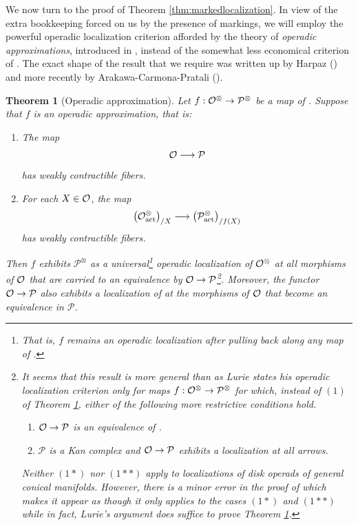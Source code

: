 \documentclass[10pt, reqno, twoside
, final
]{amsart}
\numberwithin{equation}{subsection}%
\theoremstyle{definition}
\theoremstyle{definition}
\theoremstyle{definition}
\theoremstyle{definition}
\theoremstyle{definition}
\theoremstyle{definition}
\theoremstyle{definition}
\theoremstyle{definition}
\theoremstyle{definition}
\theoremstyle{plain}
\newtheorem{thm}[defn]{Theorem}
\theoremstyle{definition}
\theoremstyle{plain}
\theoremstyle{definition}
\theoremstyle{plain}
\theoremstyle{definition}
\theoremstyle{definition}
\theoremstyle{plain}
\theoremstyle{plain}
\theoremstyle{definition}
\theoremstyle{plain}
\theoremstyle{plain}
\theoremstyle{plain}
\begin{document}
We now turn to the proof of Theorem \ref{thm:markedlocalization}. In view of the extra bookkeeping forced on us by the presence of markings, we will employ the powerful operadic localization criterion afforded by the theory of \emph{operadic approximations}, introduced in \cite[Section 2.3.3]{LurHA}, instead of the somewhat less economical criterion of \cite[Lemma A.4.7]{KSW}. The exact shape of the result that we require was written up by Harpaz (\cite{Harpaz-littledisks}) and more recently by Arakawa-Carmona-Pratali (\cite{ACP-DendroidalRezkNerve}).
\begin{thm}[Operadic approximation]\label{thm:operadic approximation}
Let $f:\mathcal{O}^{\otimes}\rightarrow \mathcal{P}^{\otimes}$ be a map of \infopst. Suppose that $f$ is an \emph{operadic approximation}, that is:
\begin{enumerate}[$(1)$]
    \item The map 
    \[  \mathcal{O}\longrightarrow \mathcal{P} \]
    has weakly contractible fibers.
    \item For each $X\in \mathcal{O}$, the map 
    \[ \left(\mathcal{O}^{\otimes}_{\mathrm{act}} \right)_{/X}\longrightarrow \left(\mathcal{P}^{\otimes}_{\mathrm{act}} \right)_{/f(X)} \]
    has weakly contractible fibers.
\end{enumerate}
Then $f$ exhibits $\mathcal{P}^{\otimes}$ as a \emph{universal}\footnote{That is, $f$ remains an operadic localization after pulling back along any map of \infopst.} operadic localization of $\mathcal{O}^{\otimes}$ at all morphisms of $\mathcal{O}$ that are carried to an equivalence by $\mathcal{O}\rightarrow\mathcal{P}$\footnote{It seems that this result is more general than \cite[Theorem 2.3.3.23]{LurHA} as Lurie states his operadic localization criterion only for maps $f:\mathcal{O}^{\otimes}\rightarrow\mathcal{P}^{\otimes}$ for which, instead of $(1)$ of Theorem \ref{thm:operadic approximation}, either of the following more restrictive conditions hold. 
\begin{enumerate}
    \item[$(1*)$] $\mathcal{O}\rightarrow \mathcal{P}$ is an equivalence of \infcatst.
    \item[$(1**)$] $\mathcal{P}$ is a Kan complex and $\mathcal{O}\rightarrow \mathcal{P}$ exhibits a localization at all arrows.
\end{enumerate}
Neither $(1*)$ nor $(1**)$ apply to localizations of disk operads of general conical manifolds. However, there is a minor error in the proof of \cite[Theorem 2.3.3.23]{LurHA} which makes it appear as though it only applies to the cases $(1*)$ and $(1**)$ while in fact, Lurie's argument does suffice to prove Theorem \ref{thm:operadic approximation}.}. Moreover, the functor $\mathcal{O}\rightarrow\mathcal{P}$ also exhibits a localization of \infcats at the morphisms of $\mathcal{O}$ that become an equivalence in $\mathcal{P}$.
\end{thm}
\end{document}
